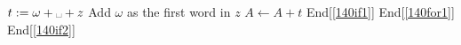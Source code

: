 \begin{algorithm}[H]
\begin{algorithmic}[1]
\Else
\State $t:=\omega+\text{\textvisiblespace}+z$ \Comment Add $\omega$ as the first word in $z$
\State $A\gets A + t$
\EndIf \Comment End[\ref{140if1}]
\EndFor \Comment End[\ref{140for1}]
\EndIf \Comment End[\ref{140if2}]
\EndFor
\EndFunction
\end{algorithmic}
\end{algorithm}
